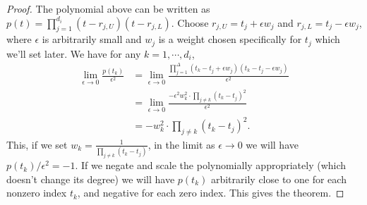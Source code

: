 \documentclass{article}
\begin{document}
\begin{proof}
The polynomial above can be written as $p(t) = \prod_{j=1}^{d_i} (t-r_{j,U}) (t-r_{j,L})$. Choose $r_{j,U} = t_j + \epsilon w_j$ and $r_{j,L} = t_j - \epsilon w_j$, where $\epsilon$ is arbitrarily small and $w_j$ is a weight chosen specifically for $t_j$ which we'll set later. We have for any $k = 1,\cdots, d_i$,
\begin{align*}
\lim_{\epsilon \rightarrow 0} \frac{p(t_k)}{\epsilon^2} &= \lim_{\epsilon \rightarrow 0} \frac{\prod_{j=1}^\Delta (t_k-t_j+\epsilon w_j) (t_k-t_j - \epsilon w_j)}{\epsilon^2}\\
& =  \lim_{\epsilon \rightarrow 0} \frac{- \epsilon^2 w_k^2 \cdot \prod_{j\neq k} (t_k - t_j)^2}{\epsilon^2}\\
& = -w_k^2 \cdot \prod_{j\neq k} (t_k - t_j)^2.
\end{align*}
This, if we set $w_k = \frac{1}{\prod_{j\neq k} (t_k - t_j)}$, in the limit as $\epsilon \rightarrow 0$ we will have $p(t_k)/\epsilon^2 = -1$. If we negate and scale the polynomially appropriately (which doesn't change its degree) we will have $p(t_k)$ arbitrarily close to one for each nonzero index $t_k$, and negative for each zero index. This gives the theorem.
\end{proof}
\end{document}
